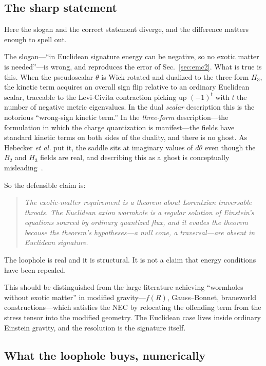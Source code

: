 \documentclass[twocolumn,floatfix,aps,prd,nofootinbib]{revtex4-2}
\begin{document}
\subsection{The sharp statement}
\label{sec:sharp}

Here the slogan and the correct statement diverge, and the difference matters enough to spell out.

The slogan---``in Euclidean signature energy can be negative, so no exotic matter is needed''---is wrong, and reproduces the error of Sec.~\ref{sec:emc2}. What is true is this. When the pseudoscalar $\theta$ is Wick-rotated and dualized to the three-form $H_3$, the kinetic term acquires an overall sign flip relative to an ordinary Euclidean scalar, traceable to the Levi-Civita contraction picking up $(-1)^t$ with $t$ the number of negative metric eigenvalues. In the dual \emph{scalar} description this is the notorious ``wrong-sign kinetic term.'' In the \emph{three-form} description---the formulation in which the charge quantization is manifest---the fields have standard kinetic terms on both sides of the duality, and there is no ghost. As Hebecker \emph{et al.} put it, the saddle sits at imaginary values of $d\theta$ even though the $B_2$ and $H_3$ fields are real, and describing this as a ghost is conceptually misleading~\cite{hebecker2018,alonso_urbano2019}.

So the defensible claim is:
\begin{quote}
\emph{The exotic-matter requirement is a theorem about Lorentzian traversable throats. The Euclidean axion wormhole is a regular solution of Einstein's equations sourced by ordinary quantized flux, and it evades the theorem because the theorem's hypotheses---a null cone, a traversal---are absent in Euclidean signature.}
\end{quote}
The loophole is real and it is structural. It is not a claim that energy conditions have been repealed.

This should be distinguished from the large literature achieving ``wormholes without exotic matter'' in modified gravity---$f(R)$, Gauss--Bonnet, braneworld constructions---which satisfies the NEC by relocating the offending term from the stress tensor into the modified geometry. The Euclidean case lives inside ordinary Einstein gravity, and the resolution is the signature itself.

\subsection{What the loophole buys, numerically}
\end{document}
